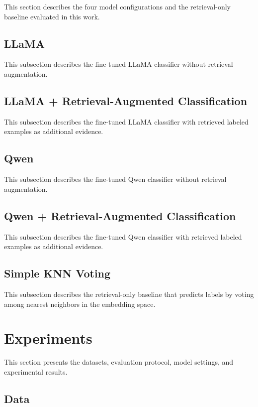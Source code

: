 \documentclass[letterpaper]{article} %
\begin{document}
This section describes the four model configurations and the retrieval-only baseline evaluated in this work.

\subsection{LLaMA}

This subsection describes the fine-tuned LLaMA classifier without retrieval augmentation.

\subsection{LLaMA + Retrieval-Augmented Classification}

This subsection describes the fine-tuned LLaMA classifier with retrieved labeled examples as additional evidence.

\subsection{Qwen}

This subsection describes the fine-tuned Qwen classifier without retrieval augmentation.

\subsection{Qwen + Retrieval-Augmented Classification}

This subsection describes the fine-tuned Qwen classifier with retrieved labeled examples as additional evidence.

\subsection{Simple KNN Voting}

This subsection describes the retrieval-only baseline that predicts labels by voting among nearest neighbors in the embedding space.

\section{Experiments}

This section presents the datasets, evaluation protocol, model settings, and experimental results.

\subsection{Data}
\end{document}
